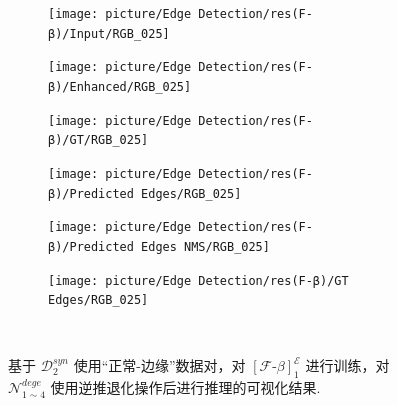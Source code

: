 \documentclass[a4paper]{ctexart}
\begin{document}
\begin{figure}[htbp]
			\begin{subfigure}{0.16\textwidth}
				\texttt{[image: picture/Edge Detection/res(F-β)/Input/RGB\_025]}
				\captionsetup{font=scriptsize}
				\label{fig: RGB_025}
			\end{subfigure}
			\begin{subfigure}{0.16\textwidth}
				\texttt{[image: picture/Edge Detection/res(F-β)/Enhanced/RGB\_025]}
				\captionsetup{font=scriptsize}
				\label{fig: RGB_025 Enhanced}
			\end{subfigure}
			\begin{subfigure}{0.16\textwidth}
				\texttt{[image: picture/Edge Detection/res(F-β)/GT/RGB\_025]}
				\captionsetup{font=scriptsize}
				\label{fig: RGB_025 GT}
			\end{subfigure}
			\begin{subfigure}{0.16\textwidth}
				\texttt{[image: picture/Edge Detection/res(F-β)/Predicted Edges/RGB\_025]}
				\captionsetup{font=scriptsize}
				\label{fig: RGB_025 Pred}
			\end{subfigure}
			\begin{subfigure}{0.16\textwidth}
				\texttt{[image: picture/Edge Detection/res(F-β)/Predicted Edges NMS/RGB\_025]}
				\captionsetup{font=scriptsize}
				\label{fig: RGB_025 Pred NMS}
			\end{subfigure}
			\begin{subfigure}{0.16\textwidth}
				\texttt{[image: picture/Edge Detection/res(F-β)/GT Edges/RGB\_025]}
				\captionsetup{font=scriptsize}
				\label{fig: RGB_025 GT Edges}
			\end{subfigure} \\
			\caption{基于 $\mathcal{D}^{syn}_{2}$ 使用“正常-边缘”数据对，对 ${\left[\mathcal{F}\text{-}\beta\right]}^{\mathcal{E}}_1$ 进行训练，对 $\mathcal{N}_{1 \sim 4}^{dege}$ 使用逆推退化操作后进行推理的可视化结果.}
		\end{figure}
		
		\renewcommand{\refname}{References}
		
		
			
			
			
			
			
			
		
		
		
		
		
	
\end{document}
